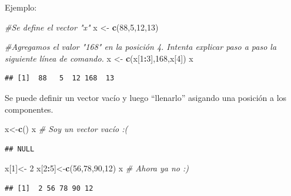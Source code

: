 \documentclass[
]{book}
\newenvironment{Shaded}{\begin{snugshade}}{\end{snugshade}}
\newcommand{\CommentTok}[1]{\textcolor[rgb]{0.56,0.35,0.01}{\textit{#1}}}
\newcommand{\DecValTok}[1]{\textcolor[rgb]{0.00,0.00,0.81}{#1}}
\newcommand{\FunctionTok}[1]{\textcolor[rgb]{0.13,0.29,0.53}{\textbf{#1}}}
\newcommand{\NormalTok}[1]{#1}
\newcommand{\OtherTok}[1]{\textcolor[rgb]{0.56,0.35,0.01}{#1}}
\newcommand{\SpecialCharTok}[1]{\textcolor[rgb]{0.81,0.36,0.00}{\textbf{#1}}}
\begin{document}
Ejemplo:

\begin{Shaded}
\begin{Highlighting}[]
\CommentTok{\#Se define el vector "x"}
\NormalTok{x }\OtherTok{\textless{}{-}} \FunctionTok{c}\NormalTok{(}\DecValTok{88}\NormalTok{,}\DecValTok{5}\NormalTok{,}\DecValTok{12}\NormalTok{,}\DecValTok{13}\NormalTok{)}

\CommentTok{\#Agregamos el valor "168" en la posición 4. Intenta explicar paso a paso la siguiente línea de comando. }
\NormalTok{x }\OtherTok{\textless{}{-}} \FunctionTok{c}\NormalTok{(x[}\DecValTok{1}\SpecialCharTok{:}\DecValTok{3}\NormalTok{],}\DecValTok{168}\NormalTok{,x[}\DecValTok{4}\NormalTok{]) }
\NormalTok{x}
\end{Highlighting}
\end{Shaded}

\begin{verbatim}
## [1]  88   5  12 168  13
\end{verbatim}

Se puede definir un vector vacío y luego ``llenarlo'' asigando una posición a los componentes.

\begin{Shaded}
\begin{Highlighting}[]
\NormalTok{x}\OtherTok{\textless{}{-}}\FunctionTok{c}\NormalTok{()}
\NormalTok{x                 }\CommentTok{\# Soy un vector vacío :(}
\end{Highlighting}
\end{Shaded}

\begin{verbatim}
## NULL
\end{verbatim}

\begin{Shaded}
\begin{Highlighting}[]
\NormalTok{x[}\DecValTok{1}\NormalTok{]}\OtherTok{\textless{}{-}} \DecValTok{2}
\NormalTok{x[}\DecValTok{2}\SpecialCharTok{:}\DecValTok{5}\NormalTok{]}\OtherTok{\textless{}{-}}\FunctionTok{c}\NormalTok{(}\DecValTok{56}\NormalTok{,}\DecValTok{78}\NormalTok{,}\DecValTok{90}\NormalTok{,}\DecValTok{12}\NormalTok{)}
\NormalTok{x                 }\CommentTok{\# Ahora ya no :)}
\end{Highlighting}
\end{Shaded}

\begin{verbatim}
## [1]  2 56 78 90 12
\end{verbatim}
\end{document}
